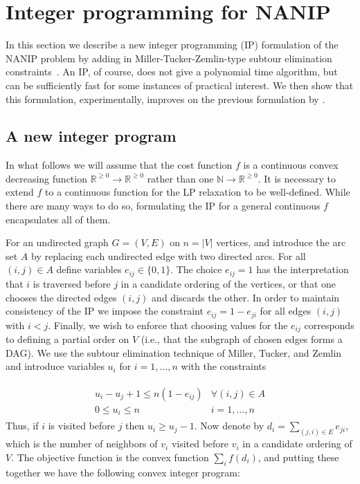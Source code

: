 \documentclass[english]{llncs}
\begin{document}
\section{Integer programming for NANIP}\label{section:IP}

In this section we describe a new integer programming (IP) formulation of the
NANIP problem by adding in Miller-Tucker-Zemlin-type subtour elimination
constraints~\cite{miller1960integer}.  An IP, of course, does not give a
polynomial time algorithm, but can be sufficiently fast for some instances of
practical interest.  We then show that this formulation, experimentally,
improves on the previous formulation by \cite{Gutfraind14}.

\subsection{A new integer program}

In what follows we will assume that the cost function $f$ is a continuous
convex decreasing function $\mathbb{R}^{\geq 0} \to \mathbb{R}^{\geq 0}$ rather
than one $\mathbb{N} \to \mathbb{R}^{\geq 0}$. It is necessary to extend $f$ to
a continuous function for the LP relaxation to be well-defined.  While there
are many ways to do so, formulating the IP for a general continuous $f$
encapsulates all of them.

For an undirected graph $G = (V,E)$ on $n = |V|$ vertices, and introduce the
arc set $A$ by replacing each undirected edge with two directed arcs.  For all
$(i,j)\in A$ define variables $e_{ij} \in \{ 0,1 \}$.  The choice $e_{ij} = 1$
has the interpretation that $i$ is traversed before $j$ in a candidate ordering
of the vertices, or that one chooses the directed edges $(i,j)$ and discards
the other. In order to maintain consistency of the IP we impose the constraint
$e_{ij} = 1 - e_{ji}$ for all edges $(i,j)$ with $i < j$. Finally, we wish to
enforce that choosing values for the $e_{ij}$ corresponds to defining a partial
order on $V$ (i.e., that the subgraph of chosen edges forms a DAG). We use the
subtour elimination technique of Miller, Tucker, and Zemlin
\cite{miller1960integer} and introduce variables $u_i$ for $i = 1, \dots, n$
with the constraints

\begin{align}
\label{eq:dag-constraint}
\begin{matrix}
   u_i - u_j + 1 \leq n (1 - e_{ij}) & \forall (i,j) \in A \\ 
   0 \leq u_i \leq n & i = 1, \dots, n 
\end{matrix}
\end{align}
\noindent Thus, if $i$ is visited before $j$ then $u_i \geq u_j - 1$.
Now denote by $d_i = \sum_{(j,i) \in E} e_{ji}$, which is the number of
neighbors of $v_i$ visited before $v_i$ in a candidate ordering of $V$. The
objective function is the convex function $\sum_{i} f(d_i)$, and putting these
together we have the following convex integer program: 
\end{document}
